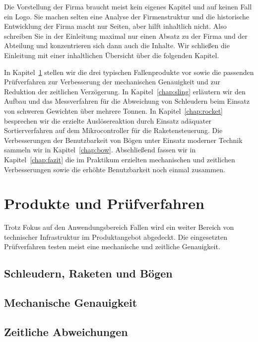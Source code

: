 \documentclass[11pt,a4paper]{report}
\begin{document}
Die Vorstellung der Firma
braucht meist kein eigenes Kapitel und auf keinen Fall ein Logo.
Sie machen selten eine Analyse der Firmenstruktur und die
historische Entwicklung der Firma macht nur Seiten, aber hilft
inhaltlich nicht.
Also schreiben Sie in der Einleitung maximal nur einen Absatz
zu der Firma und der Abteilung und konzentrieren sich dann auch
die Inhalte.
Wir schließen die Einleitung mit einer inhaltlichen Übersicht
über die folgenden Kapitel.

In Kapitel~\ref{chap:ppv} stellen wir die drei typischen Fallenprodukte
vor sowie die passenden Prüfverfahren zur Verbesserung der
mechanischen Genauigkeit und zur Reduktion der zeitlichen Verzögerung.
In Kapitel~\ref{chap:sling} erläutern wir den Aufbau und das Messverfahren
für die Abweichung von Schleudern beim Einsatz von schweren Gewichten
über mehrere Tonnen.
In Kapitel~\ref{chap:rocket} besprechen wir die erzielte Auslösereaktion
durch Einsatz adäquater Sortierverfahren auf dem Mikrocontroller für die
Raketensteuerung.
Die Verbesserungen der Benutzbarkeit von Bögen unter Einsatz moderner Technik
sammeln wir in Kapitel~\ref{chap:bow}.
Abschließend fassen wir in Kapitel~\ref{chap:fazit} die im Praktikum
erzielten mechanischen und zeitlichen Verbesserungen sowie die
erhöhte Benutzbarkeit noch einmal zusammen.


\chapter{Produkte und Prüfverfahren} \label{chap:ppv}

Trotz Fokus auf den Anwendungsbereich Fallen wird ein weiter Bereich
von technischer Infrastruktur im Produktangebot abgedeckt.
Die eingesetzten Prüfverfahren testen meist eine mechanische
und zeitliche Genauigkeit.

\section{Schleudern, Raketen und Bögen} \label{sec:was}

\section{Mechanische Genauigkeit} \label{sec:mec}

\section{Zeitliche Abweichungen} \label{sec:time}
\end{document}
